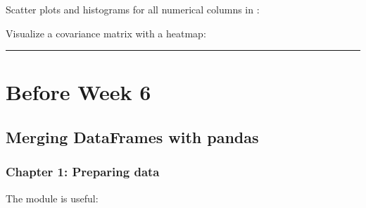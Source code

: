 \documentclass[letterpaper,10pt,english]{sphinxmanual}
\begin{document}
Scatter plots and histograms for all numerical columns in :

\begin{sphinxVerbatim}[commandchars=\\\{\}]
             
     
\end{sphinxVerbatim}

Visualize a covariance matrix with a heatmap:

\begin{sphinxVerbatim}[commandchars=\\\{\}]
   \PYG{p}{[}\PYG{p}{[}\PYG{p}{]}\PYG{p}{]} 
                
  
\end{sphinxVerbatim}


\bigskip\hrule\bigskip



\section{Before Week 6}
\label{\detokenize{big-cheat-sheet:before-week-6}}

\subsection{Merging DataFrames with pandas}
\label{\detokenize{big-cheat-sheet:merging-dataframes-with-pandas}}

\subsubsection{Chapter 1: Preparing data}
\label{\detokenize{big-cheat-sheet:chapter-1-preparing-data}}
The  module is useful:
\end{document}
